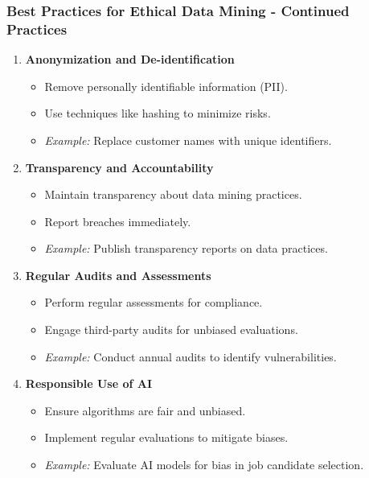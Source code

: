 \documentclass[aspectratio=169]{beamer}
\begin{document}
\begin{frame}[fragile]
    \frametitle{Best Practices for Ethical Data Mining - Continued Practices}
    \begin{enumerate}[resume]
        \item \textbf{Anonymization and De-identification}
            \begin{itemize}
                \item Remove personally identifiable information (PII).
                \item Use techniques like hashing to minimize risks.
                \item \textit{Example:} Replace customer names with unique identifiers.
            \end{itemize}

        \item \textbf{Transparency and Accountability}
            \begin{itemize}
                \item Maintain transparency about data mining practices.
                \item Report breaches immediately.
                \item \textit{Example:} Publish transparency reports on data practices.
            \end{itemize}

        \item \textbf{Regular Audits and Assessments}
            \begin{itemize}
                \item Perform regular assessments for compliance.
                \item Engage third-party audits for unbiased evaluations.
                \item \textit{Example:} Conduct annual audits to identify vulnerabilities.
            \end{itemize}

        \item \textbf{Responsible Use of AI}
            \begin{itemize}
                \item Ensure algorithms are fair and unbiased.
                \item Implement regular evaluations to mitigate biases.
                \item \textit{Example:} Evaluate AI models for bias in job candidate selection.
            \end{itemize}
    \end{enumerate}
\end{frame}
\end{document}
